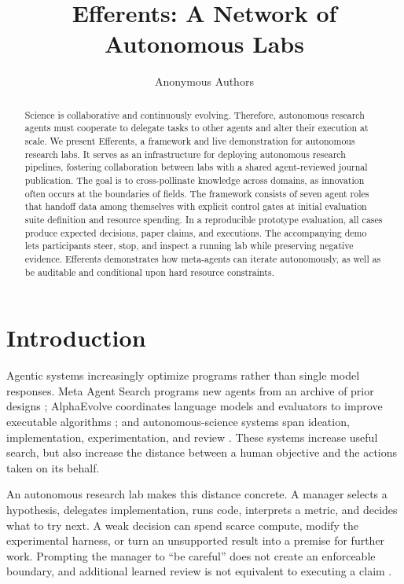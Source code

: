 \documentclass{article}
\title{Efferents: A Network of Autonomous Labs}
\author{Anonymous Authors}
\begin{document}
\maketitle
\begin{abstract}
Science is collaborative and continuously evolving. Therefore, autonomous research agents must cooperate to delegate tasks to other agents and alter their execution at scale. We present Efferents, a framework and live demonstration for autonomous research labs. It serves as an infrastructure for deploying autonomous research pipelines, fostering collaboration between labs with a shared agent-reviewed journal publication. The goal is to cross-pollinate knowledge across domains, as innovation often occurs at the boundaries of fields. The framework consists of seven agent roles that handoff data among themselves with explicit control gates at initial evaluation suite definition and resource spending. In a reproducible prototype evaluation, all cases produce expected decisions, paper claims, and executions. The accompanying demo lets participants steer, stop, and inspect a running lab while preserving negative evidence. Efferents demonstrates how meta-agents can iterate autonomously, as well as be auditable and conditional upon hard resource constraints.
\end{abstract}

\section{Introduction}

Agentic systems increasingly optimize programs rather than single model responses. Meta Agent Search programs new agents from an archive of prior designs \citep{hu2024adas}; AlphaEvolve coordinates language models and evaluators to improve executable algorithms \citep{novikov2025alphaevolve}; and autonomous-science systems span ideation, implementation, experimentation, and review \citep{lu2024aiscientist}. These systems increase useful search, but also increase the distance between a human objective and the actions taken on its behalf.

An autonomous research lab makes this distance concrete. A manager selects a hypothesis, delegates implementation, runs code, interprets a metric, and decides what to try next. A weak decision can spend scarce compute, modify the experimental harness, or turn an unsupported result into a premise for further work. Prompting the manager to ``be careful'' does not create an enforceable boundary, and additional learned review is not equivalent to executing a claim \citep{mcaleese2024critics}.
\end{document}
